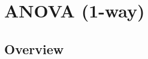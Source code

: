 \documentclass[11pt,fleqn]{book} %
\begin{document}








\chapter{ANOVA (1-way)}

\section{Overview}
\end{document}
